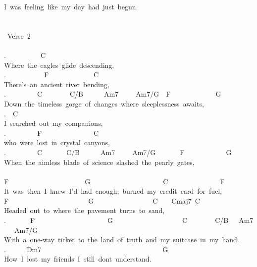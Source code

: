 {I\ was\ feeling\ like\ my\ day\ had\ just\ begun.\\
\\
\\
\lbrack\ Verse\ 2\rbrack\\
\\
.\ \ \ \ \ \ \ \ \ \ C\ \\
Where\ the\ eagles\ glide\ descending,\\
.\ \ \ \ \ \ \ \ \ \ \ F\ \ \ \ \ \ \ \ \ \ \ \ \ C\ \\
There's\ an\ ancient\ river\ bending,\\
.\ \ \ \ \ \ \ \ \ C\ \ \ \ \ \ \ \ C/B\ \ \ \ \ \ Am7\ \ \ \ \ Am7/G\ \ F\ \ \ \ \ \ \ \ \ \ \ \ \ G\\
Down\ the\ timeless\ gorge\ of\ changes\ where\ sleeplessness\ awaits,\\
.\ \ C\\
I\ searched\ out\ my\ companions,\\
.\ \ \ \ \ \ \ \ \ F\ \ \ \ \ \ \ \ \ \ \ \ \ \ \ C\\
who\ were\ lost\ in\ crystal\ canyons,\\
.\ \ \ \ \ \ \ \ \ C\ \ \ \ \ \ \ C/B\ \ \ \ \ \ Am7\ \ \ \ \ Am7/G\ \ \ \ \ \ \ F\ \ \ \ \ \ \ \ \ \ \ \ G\ \ \\
When\ the\ aimless\ blade\ of\ science\ slashed\ the\ pearly\ gates,\\
\\
F\ \ \ \ \ \ \ \ \ \ \ \ \ \ \ \ \ \ \ \ \ \ G\ \ \ \ \ \ \ \ \ \ \ \ \ \ \ \ \ \ \ \ \ C\ \ \ \ \ \ \ \ \ \ \ \ \ \ \ F\ \\
It\ was\ then\ I\ knew\ I'd\ had\ enough,\ burned\ my\ credit\ card\ for\ fuel,\\
F\ \ \ \ \ \ \ \ \ \ \ \ \ \ \ \ \ \ \ \ \ \ \ G\ \ \ \ \ \ \ \ \ \ \ \ \ \ \ \ \ C\ \ \ \ Cmaj7\ C\\
Headed\ out\ to\ where\ the\ pavement\ turns\ to\ sand,\\
.\ \ \ \ \ \ \ F\ \ \ \ \ \ \ \ \ \ \ \ \ \ \ \ \ \ \ \ \ G\ \ \ \ \ \ \ \ \ \ \ \ \ \ \ \ \ \ \ \ C\ \ \ \ \ \ \ \ C/B\ \ \ Am7\ \ \ Am7/G\ \\
With\ a\ one-way\ ticket\ to\ the\ land\ of\ truth\ and\ my\ suitcase\ in\ my\ hand.\\
.\ \ \ \ \ \ Dm7\ \ \ \ \ \ \ \ \ \ \ \ \ \ \ \ \ \ \ \ \ \ \ \ \ \ \ \ \ \ \ \ \ \ \ G\\
How\ I\ lost\ my\ friends\ I\ still\ dont\ understand.\\
\\
\\
}
